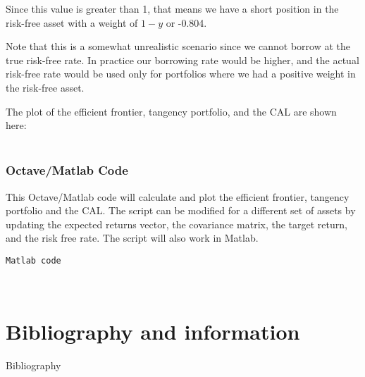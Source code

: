 \documentclass[12pt,a4paper]{article}
\begin{document}
Since this value is greater than 1, that means we have a short position in the risk-free asset with a weight of $1-y$ or -0.804.

Note that this is a somewhat unrealistic scenario since we cannot borrow at the true risk-free rate.  In practice our borrowing rate would be higher, and the actual risk-free rate would be used only for portfolios where we had a positive weight in the risk-free asset.

The plot of the efficient frontier, tangency portfolio, and the CAL are shown here:\\


~\\

\subsubsection{Octave/Matlab Code}

This Octave/Matlab code will calculate and plot the efficient frontier, tangency portfolio and the CAL. The script can be modified for a different set of assets by updating the expected returns vector, the covariance matrix, the target return, and the risk free rate. The script will also work in Matlab.

\lstset{language=Matlab}
\begin{lstlisting}[frame=single]
Matlab code
\end{lstlisting}

~\\
\section{Bibliography and information}

Bibliography
\end{document}
